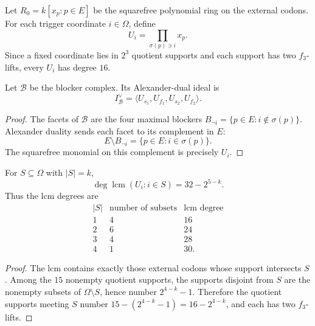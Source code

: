 \begin{definition}
\label{def:philosophy-alexander-dual-coordinate-monomials}
Let $R_{0}=k[x_{p}:p\in E]$ be the squarefree polynomial ring on the
external codons. For each trigger coordinate $i\in\Omega$, define
$$
  U_{i}=\prod_{\sigma(p)\ni i}x_{p}.
$$
Since a fixed coordinate lies in $2^{3}$ quotient supports and each
support has two $f_{3}$-lifts, every $U_{i}$ has degree $16$.
\end{definition}

\begin{theorem}
\label{thm:philosophy-alexander-dual-blocker-ideal}
Let $\mathcal{B}$ be the blocker complex. Its Alexander-dual ideal is
$$
  I_{\mathcal{B}}^{\vee}
  =
  \langle
  U_{s_{1}},U_{f_{1}},U_{s_{2}},U_{f_{2}}
  \rangle.
$$
\end{theorem}
\begin{proof}
The facets of $\mathcal{B}$ are the four maximal blockers
$B_{\neg i}=\{p\in E:i\notin\sigma(p)\}$. Alexander duality sends each
facet to its complement in $E$:
$$
  E\setminus B_{\neg i}=\{p\in E:i\in\sigma(p)\}.
$$
The squarefree monomial on this complement is precisely $U_{i}$.
\end{proof}

\begin{theorem}
\label{thm:philosophy-alexander-dual-lcm-degrees}
For $S\subseteq\Omega$ with $|S|=k$,
$$
  \deg\operatorname{lcm}(U_{i}:i\in S)
  =
  32-2^{5-k}.
$$
Thus the lcm degrees are
$$
\begin{array}{c|r|r}
  |S| & \text{number of subsets} & \text{lcm degree}\\
  \hline
  1 & 4 & 16\\
  2 & 6 & 24\\
  3 & 4 & 28\\
  4 & 1 & 30.
\end{array}
$$
\end{theorem}
\begin{proof}
The lcm contains exactly those external codons whose support intersects
$S$. Among the $15$ nonempty quotient supports, the supports disjoint
from $S$ are the nonempty subsets of $\Omega\setminus S$, hence number
$2^{4-k}-1$. Therefore the quotient supports meeting $S$ number
$15-(2^{4-k}-1)=16-2^{4-k}$, and each has two $f_{3}$-lifts.
\end{proof}

